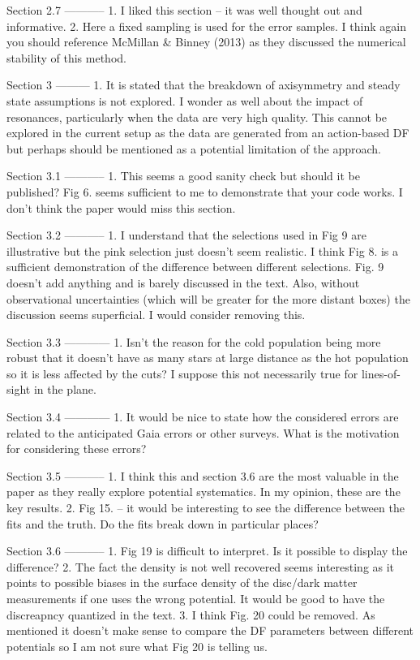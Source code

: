\documentclass[10pt,a4paper]{article}
\begin{document}
Section 2.7
-----------
1. I liked this section -- it was well thought out and informative.
2. Here a fixed sampling is used for the error samples. I think again you should
reference McMillan \& Binney (2013) as they discussed the numerical stability of this
method.

Section 3
---------
1. It is stated that the breakdown of axisymmetry and steady state assumptions is
not explored. I wonder as well about the impact of resonances, particularly when the
data are very high quality. This cannot be explored in the current setup as the data
are generated from an action-based DF but perhaps should be mentioned as a potential
limitation of the approach.

Section 3.1
-----------
1. This seems a good sanity check but should it be published? Fig 6. seems
sufficient to me to demonstrate that your code works. I don't think the paper would
miss this section.


Section 3.2
-----------
1. I understand that the selections used in Fig 9 are illustrative but the pink
selection just doesn't seem realistic. I think Fig 8. is a sufficient demonstration
of the difference between different selections. Fig. 9 doesn't add anything and is
barely discussed in the text. Also, without observational uncertainties (which will
be greater for the more distant boxes) the discussion seems superficial. I would
consider removing this.

Section 3.3
------------
1. Isn't the reason for the cold population being more robust that it doesn't have
as many stars at large distance as the hot population so it is less affected by the
cuts? I suppose this not necessarily true for lines-of-sight in the plane.

Section 3.4
------------
1. It would be nice to state how the considered errors are related to the
anticipated Gaia errors or other surveys. What is the motivation for considering
these errors?

Section 3.5
-----------
1. I think this and section 3.6 are the most valuable in the paper as they really
explore potential systematics. In my opinion, these are the key results.
2. Fig 15. -- it would be interesting to see the difference between the fits and the
truth. Do the fits break down in particular places?

Section 3.6
-----------
1. Fig 19 is difficult to interpret. Is it possible to display the difference?
2. The fact the density is not well recovered seems interesting as it points to
possible biases in the surface density of the disc/dark matter measurements if one
uses the wrong potential. It would be good to have the discreapncy quantized in the
text.
3. I think Fig. 20 could be removed. As mentioned it doesn't make sense to compare
the DF parameters between different potentials so I am not sure what Fig 20 is
telling us.
\end{document}
